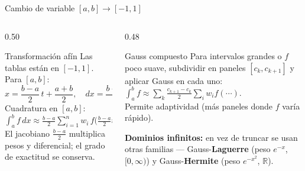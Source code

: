 \documentclass[aspectratio=169,10pt]{beamer}
\begin{document}
\begin{frame}{Cambio de variable $[a,b]\to[-1,1]$}
\begin{columns}[T]
\begin{column}{0.50\textwidth}
\begin{cardidea}{Transformación afín}{\faSuperscript}
{\footnotesize Las tablas están en $[-1,1]$. Para $[a,b]$:\\[0.3mm]
$x=\dfrac{b-a}{2}\,t+\dfrac{a+b}{2},\quad dx=\dfrac{b-a}{2}\,dt.$\\[1.0mm]
Cuadratura en $[a,b]$:\\[0.2mm]
$\displaystyle\int_a^b f\,dx\approx\frac{b-a}{2}\sum_{i=1}^n w_i\,f\!\Big(\tfrac{b-a}{2}t_i+\tfrac{a+b}{2}\Big).$\\[0.9mm]
El jacobiano $\tfrac{b-a}{2}$ multiplica pesos y diferencial; el grado de exactitud se conserva.}
\end{cardidea}
\end{column}
\begin{column}{0.48\textwidth}
\begin{cardgear}{Gauss compuesto}{\faCogs}
{\footnotesize Para intervalos grandes o $f$ poco suave, subdividir en paneles $[c_k,c_{k+1}]$ y aplicar Gauss en cada uno:\\[0.3mm]
$\displaystyle\int_a^b f\approx\sum_k\frac{c_{k+1}-c_k}{2}\sum_i w_i f(\cdots).$\\[0.3mm]
Permite adaptividad (más paneles donde $f$ varía rápido).}
\end{cardgear}
\vspace{1mm}
\begin{cardnota}[\faInfoCircle]
{\footnotesize \textbf{Dominios infinitos:} en vez de truncar se usan otras familias — Gauss-\textbf{Laguerre} (peso $e^{-x}$, $[0,\infty)$) y Gauss-\textbf{Hermite} (peso $e^{-x^2}$, $\mathbb{R}$).}
\end{cardnota}
\end{column}
\end{columns}
\end{frame}
\end{document}
